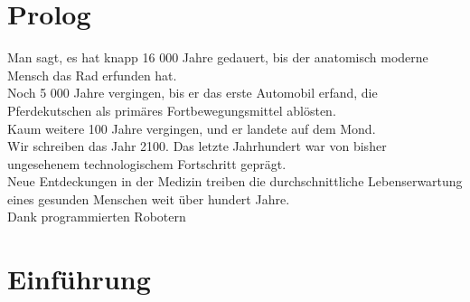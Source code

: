 \section{Prolog}

Man sagt, es hat knapp 16 000 Jahre gedauert, bis der anatomisch moderne Mensch das Rad erfunden hat. \\
Noch 5 000 Jahre vergingen, bis er das erste Automobil erfand, die Pferdekutschen als primäres Fortbewegungsmittel ablösten. \\
Kaum weitere 100 Jahre vergingen, und er landete auf dem Mond. \\

Wir schreiben das Jahr 2100. Das letzte Jahrhundert war von bisher ungesehenem technologischem Fortschritt geprägt. \\
Neue Entdeckungen in der Medizin treiben die durchschnittliche Lebenserwartung eines gesunden Menschen weit über hundert Jahre. \\
Dank programmierten Robotern 



\section{Einführung}
